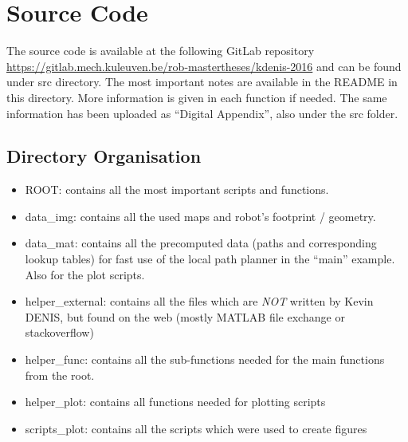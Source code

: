 \chapter{Source Code}\label{app:SourceCode}
The source code is available at the following GitLab repository \url{https://gitlab.mech.kuleuven.be/rob-mastertheses/kdenis-2016} and can be found under src directory. The most important notes are available in the README in this directory. More information is given in each function if needed. The same information has been uploaded as ``Digital Appendix'', also under the src folder. 

\section{Directory Organisation}\label{directory-organisation}
\begin{itemize}
\tightlist
\item ROOT: contains all the most important scripts and functions.
\item data\_img: contains all the used maps and robot's footprint / geometry.
\item data\_mat: contains all the precomputed data (paths and corresponding lookup tables) for fast use of the local path planner in  the ``main'' example. Also for the plot scripts.
\item helper\_external:  contains all the files which are \emph{NOT} written by Kevin DENIS, but found on the web (mostly MATLAB file exchange or stackoverflow)
\item helper\_func: contains all the sub-functions needed for the main functions from the root.
\item helper\_plot: contains all functions needed for plotting scripts
\item scripts\_plot: contains all the scripts which were used to create  figures
\end{itemize}